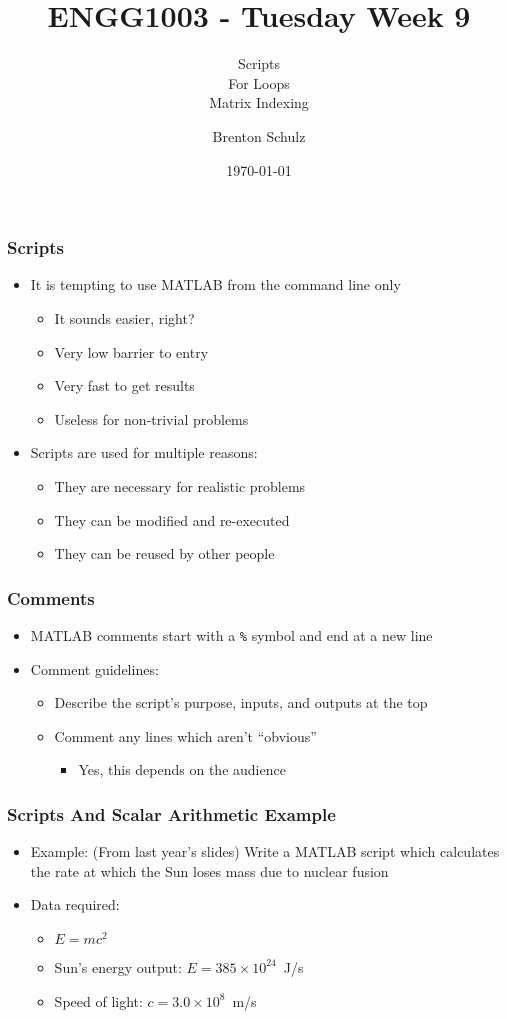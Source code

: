 \documentclass[14pt]{beamer}
\title{ENGG1003 - Tuesday Week 9}
\subtitle{Scripts\\For Loops\\Matrix Indexing}
\author{Brenton Schulz}
\institute{University of Newcastle}
\date{\today}
\begin{document}
\titlepage

\begin{frame}
\frametitle{Scripts}
\begin{itemize}
\item It is tempting to use MATLAB from the command line only
	\begin{itemize}
		\item It sounds easier, right?
		\item Very low barrier to entry
		\item Very fast to get results
		\pause
		\item Useless for non-trivial problems
	\end{itemize}
\pause
\item Scripts are used for multiple reasons:
	\begin{itemize}
		\item They are necessary for realistic problems
		\item They can be modified and re-executed
		\item They can be reused by other people
	\end{itemize}
\end{itemize}
\end{frame}

\begin{frame}
\frametitle{Comments}
\begin{itemize}
\item MATLAB comments start with a \texttt{\%} symbol and end at a new line
\item Comment guidelines:
	\begin{itemize}
		\item Describe the script's purpose, inputs, and outputs at the top
		\item Comment any lines which aren't ``obvious''
			\begin{itemize}
				\item Yes, this depends on the audience
			\end{itemize}
	\end{itemize}
\end{itemize}
\end{frame}

\begin{frame}
\frametitle{Scripts And Scalar Arithmetic Example}
\begin{itemize}
\item Example: (From last year's slides) Write a MATLAB script which calculates the rate at which the Sun loses mass due to nuclear fusion
\item Data required:
	\begin{itemize}
		\item $E=mc^2$
		\item Sun's energy output: $E=385 \times 10^{24}$~J/s
		\item Speed of light: $c=3.0 \times 10^8$~m/s
	\end{itemize}
\end{itemize}
\end{frame}
\end{document}

